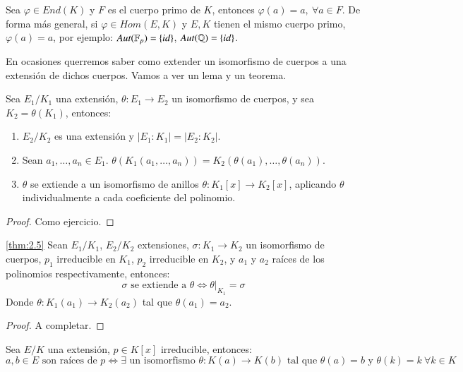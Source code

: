 \begin{obs}
    Sea $\varphi \in End(K)$ y $F$ es el cuerpo primo de $K$, entonces $\varphi(a) = a,\ \forall a \in F$. De forma más general, si $\varphi \in Hom(E, K)$ y $E, K$ tienen el mismo cuerpo primo, $\varphi(a) = a$, por ejemplo:
    $Aut(\mathbb{F}_p) = \left\{id\right\}$, $Aut(\mathbb{Q}) = \left\{id\right\}$.
\end{obs}

En ocasiones querremos saber como extender un isomorfismo de cuerpos a una extensión de dichos cuerpos. Vamos a ver un lema y un teorema.

\begin{lm}
    Sea $E_1/K_1$ una extensión, $\theta: E_1 \to E_2$ un isomorfismo de cuerpos, y sea $K_2 = \theta(K_1)$, entonces:
    \begin{enumerate}
        \item $E_2/K_2$ es una extensión y $|E_1:K_1| = |E_2:K_2|$.
        \item Sean $a_1, \ldots, a_n \in E_1$. $\theta(K_1(a_1, \ldots, a_n)) = K_2(\theta(a_1), \ldots, \theta(a_n))$.
        \item $\theta$ se extiende a un isomorfismo de anillos $\theta: K_1[x] \to K_2[x]$, aplicando $\theta$ individualmente a cada coeficiente del polinomio.
    \end{enumerate}
\end{lm}

\begin{proof}
    Como ejercicio.
\end{proof}

\begin{thm}\ref{thm:2.5} %
    Sean $E_1/K_1$, $E_2/K_2$ extensiones, $\sigma: K_1 \to K_2$ un isomorfismo de cuerpos, $p_1$ irreducible en $K_1$, $p_2$ irreducible en $K_2$, y $a_1$ y $a_2$ raíces de los polinomios respectivamente, entonces:
    $$
        \sigma \text{ se extiende a } \theta \iff \left.\theta\right|_{K_1} = \sigma
    $$
    Donde $\theta: K_1(a_1) \to K_2(a_2)$ tal que $\theta(a_1) = a_2$.
\end{thm}

\begin{proof}
    A completar.
\end{proof}

\begin{cor} %
    Sea $E/K$ una extensión, $p \in K[x]$ irreducible, entonces:\\

    $$a, b \in E \text{ son raíces de } p \iff \exists \text{ un isomorfismo } \theta: K(a) \to K(b) \text{ tal que } \theta(a) = b \text{ y } \theta(k) = k\ \forall k \in K$$
\end{cor}

